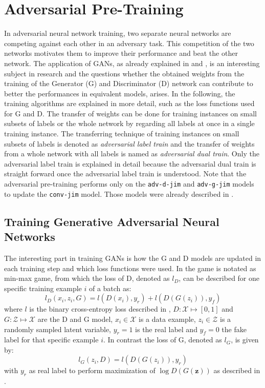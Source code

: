 
\section{Adversarial Pre-Training}\label{sec:nn_adv}
In adversarial neural network training, two separate neural networks are competing against each other in an adversary task.
This competition of the two networks motivates them to improve their performance and beat the other network.
The application of GANs, as already explained in  and , is an interesting subject in research and the questions whether the obtained weights from the training of the Generator (G) and Discriminator (D) network can contribute to better the performances in equivalent models, arises.
In the following, the training algorithms are explained in more detail, such as the loss functions used for G and D.
The transfer of weights can be done for training instances on small subsets of labels or the whole network by regarding all labels at once in a single training instance.
The transferring technique of training instances on small subsets of labels is denoted as \emph{adversarial label train} and the transfer of weights from a whole network with all labels is named as \emph{adversarial dual train}.
Only the adversarial label train is explained in detail because the adversarial dual train is straight forward once the adversarial label train is understood.
Note that the adversarial pre-training performs only on the \texttt{adv-d-jim} and \texttt{adv-g-jim} models to update the \texttt{conv-jim} model.
Those models were already described in .



\subsection{Training Generative Adversarial Neural Networks}\label{sec:nn_adv_train}
The interesting part in training GANs is how the G and D models are updated in each training step and which loss functions were used.
In  the game is notated as min-max game, from which the loss of D, denoted as $l_D$, can be described for one specific training example $i$ of a batch as:
\begin{equation}
  l_D(x_i, z_i, G) = l(D(x_i), y_r) + l(D(G(z_i)), y_f)
\end{equation}
where $l$ is the binary cross-entropy loss described in , $D: \mathcal{X} \mapsto [0, 1]$ and $G: \mathcal{Z} \mapsto \mathcal{X}$ are the D and G model, $x_i \in \mathcal{X}$ is a data example, $z_i \in \mathcal{Z}$ is a randomly sampled latent variable, $y_r = 1$ is the real label and $y_f = 0$ the fake label for that specific example $i$.
In contrast the loss of G, denoted as $l_G$, is given by:
\begin{equation}
  l_G(z_i, D) =  l(D(G(z_i)), y_r)
\end{equation}
with $y_r$ as real label to perform maximization of $\log D(G(\bm{z}))$ as described in .

